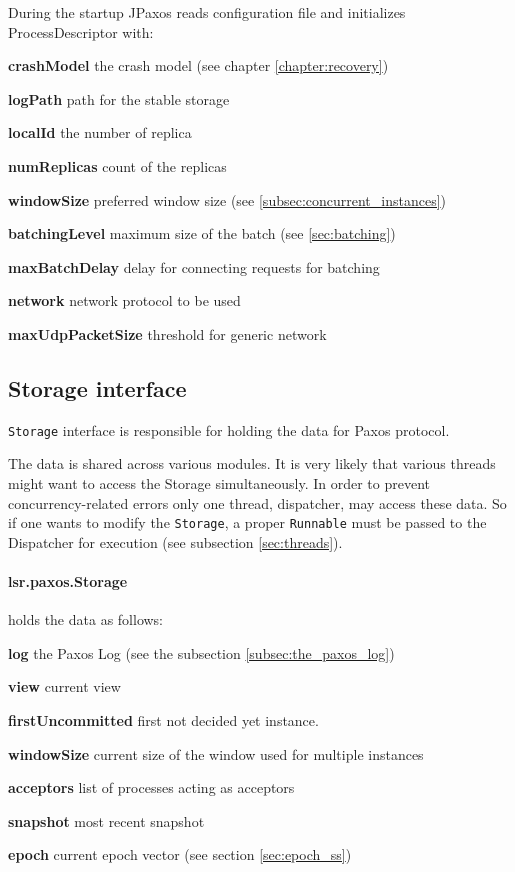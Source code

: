During the startup JPaxos reads configuration file and initializes ProcessDescriptor with:
\begin{tightList}[\setlength{\labelwidth}{0em}]
 \item[\textbf{crashModel}] the crash model (see chapter \ref{chapter:recovery})
 \item[\textbf{logPath}] path for the stable storage
 \item[\textbf{localId}] the number of replica
 \item[\textbf{numReplicas}] count of the replicas
 \item[\textbf{windowSize}] preferred window size (see \ref{subsec:concurrent_instances})
 \item[\textbf{batchingLevel}] maximum size of the batch (see \ref{sec:batching})
 \item[\textbf{maxBatchDelay}] delay for connecting requests for batching
 \item[\textbf{network}] network protocol to be used
 \item[\textbf{maxUdpPacketSize}] threshold for generic network
\end{tightList}

\subsection{Storage interface}
\label{subsec:storage_interface}

\texttt{Storage} interface is responsible for holding the data for Paxos
protocol.

The data is shared across various modules.
It is very likely that various threads might want to access the Storage simultaneously. In order to prevent concurrency-related errors only one thread, dispatcher, may access these data. So if one wants to modify the \texttt{Storage}, a proper \texttt{Runnable} must be passed to the Dispatcher for execution (see subsection \ref{sec:threads}).

\paragraph{\normalfont \ttfamily lsr.paxos.Storage}
holds the data as follows:
\begin{tightList}[\setlength{\labelwidth}{0em}]
  \item[\textbf{log}] the Paxos Log (see the subsection \ref{subsec:the_paxos_log})
  \item[\textbf{view}] current view
  \item[\textbf{firstUncommitted}] first not decided yet instance.
  \item[\textbf{windowSize}] current size of the window used for multiple instances
  \item[\textbf{acceptors}] list of processes acting as acceptors
  \item[\textbf{snapshot}] most recent snapshot
  \item[\textbf{epoch}] current epoch vector (see section \ref{sec:epoch_ss})
\end{tightList}

